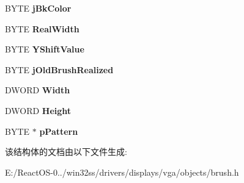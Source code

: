 \begin{DoxyCompactItemize}
B\+Y\+TE {\bfseries j\+Bk\+Color}
\item 
\mbox{\label{struct___b_r_u_s_h_i_n_s_t_afe44bd6097833e2d2935216d4daa056c}} 
B\+Y\+TE {\bfseries Real\+Width}
\item 
\mbox{\label{struct___b_r_u_s_h_i_n_s_t_a03cea027c0e9f184b9099fb55bab2f6f}} 
B\+Y\+TE {\bfseries Y\+Shift\+Value}
\item 
\mbox{\label{struct___b_r_u_s_h_i_n_s_t_a6c204d38b51ef3c4635d98b039c8487a}} 
B\+Y\+TE {\bfseries j\+Old\+Brush\+Realized}
\item 
\mbox{\label{struct___b_r_u_s_h_i_n_s_t_a73d17442dae858c2e9fd030f6a4e059d}} 
D\+W\+O\+RD {\bfseries Width}
\item 
\mbox{\label{struct___b_r_u_s_h_i_n_s_t_ad1e05b182ead3318d189be1d3d1ed076}} 
D\+W\+O\+RD {\bfseries Height}
\item 
\mbox{\label{struct___b_r_u_s_h_i_n_s_t_adc7802b62d4db2ad27dd3417e2e19661}} 
B\+Y\+TE $\ast$ {\bfseries p\+Pattern}
\end{DoxyCompactItemize}


该结构体的文档由以下文件生成\+:\begin{DoxyCompactItemize}
\item 
E\+:/\+React\+O\+S-\/0../win32ss/drivers/displays/vga/objects/brush.\+h\end{DoxyCompactItemize}
